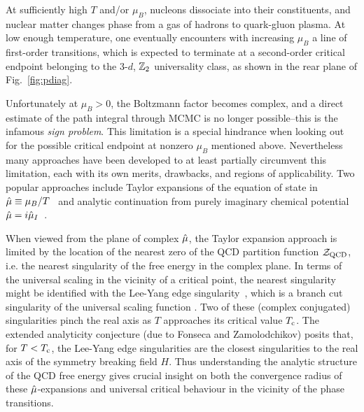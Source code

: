 At sufficiently high $T$ and/or $\mu_B$, nucleons dissociate into their constituents, 
and nuclear matter changes phase from a gas of hadrons to quark-gluon plasma.
At low enough temperature, one eventually encounters with increasing $\mu_B$ a line of 
first-order transitions, which is expected to terminate at a second-order critical 
endpoint belonging to the 3-$d$, $\mathbb{Z}_2$ universality class, as shown in the rear 
plane of Fig.~\ref{fig:pdiag}.


Unfortunately at $\mu_B>0$, the Boltzmann factor becomes complex, and a direct estimate of the path 
integral through MCMC is no longer possible--this is the infamous {\it sign problem}.
This limitation is a special hindrance when looking out for the possible critical 
endpoint at nonzero $\mu_B$ mentioned above. 
Nevertheless many approaches have been developed to at least partially circumvent this limitation, 
each with its own merits, drawbacks, and regions of applicability.
Two popular approaches include Taylor expansions of the equation of state in 
$\hat{\mu}\equiv\mu_B/T$~\cite{Allton:2002zi, Allton:2003vx, Gavai:2003mf} and analytic continuation 
from purely imaginary chemical potential  $\hat{\mu}=i\hat{\mu}_I$~\cite{deForcrand:2002hgr, DElia:2002tig}.

When viewed from the plane of complex $\hat{\mu}$, the Taylor expansion approach is limited by the 
location of the nearest zero of the QCD partition function $\mathcal{Z}_{\rm QCD}$, i.e. the nearest singularity 
of the free energy in the complex plane. 
In terms of the universal scaling in the vicinity of a critical point, the nearest singularity 
might be identified with the Lee-Yang edge 
singularity~\cite{yang_statistical_1952,lee_statistical_1952}, which is a branch cut 
singularity of the universal scaling function \cite{fonseca_zamolodchikov}. 
Two of these (complex conjugated) singularities pinch the real axis as $T$ approaches its 
critical value $T_{\rm c}$. The extended analyticity conjecture (due to Fonseca and Zamolodchikov) 
posits that, for $T < T_{\rm c}$, the Lee-Yang edge singularities are the closest singularities to 
the real axis of the symmetry breaking field $H$.
Thus understanding the analytic structure of the QCD free energy gives crucial insight on both
the convergence radius of these $\hat{\mu}$-expansions and universal critical behaviour 
in the vicinity of the phase transitions.


